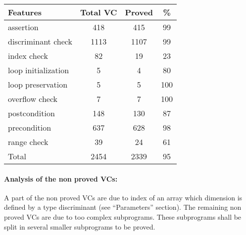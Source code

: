 \documentclass[10pt,a4paper,twocolumn]{article}
\begin{document}
\begin{tabular}{|l|c|c|c|}
\hline
Features             & Total VC & Proved & \%  \\ %
\hline
           assertion &      418 &    415 &  99 \\ %
\hline
  discriminant check &     1113 &   1107 &  99 \\ %
\hline
         index check &       82 &     19 &  23 \\ %
\hline
 loop initialization &        5 &      4 &  80 \\ %
\hline
  loop  preservation &        5 &      5 & 100 \\ %
\hline
      overflow check &        7 &      7 & 100 \\ %
\hline
       postcondition &      148 &    130 &  87 \\ %
\hline
        precondition &      637 &    628 &  98 \\ %
\hline
         range check &       39 &     24 &  61 \\ %
\hline
               Total &     2454 &   2339 &  95 \\ %
\hline
\end{tabular}


\paragraph{Analysis of the non proved VCs:}
A part of the non proved VCs are due to index of an array which dimension is defined by a type discriminant (see ``Parameters'' section).
The remaining non proved VCs are due to too complex subprograms.
These subprograms shall be split in several smaller subprograms to be proved.
\end{document}
